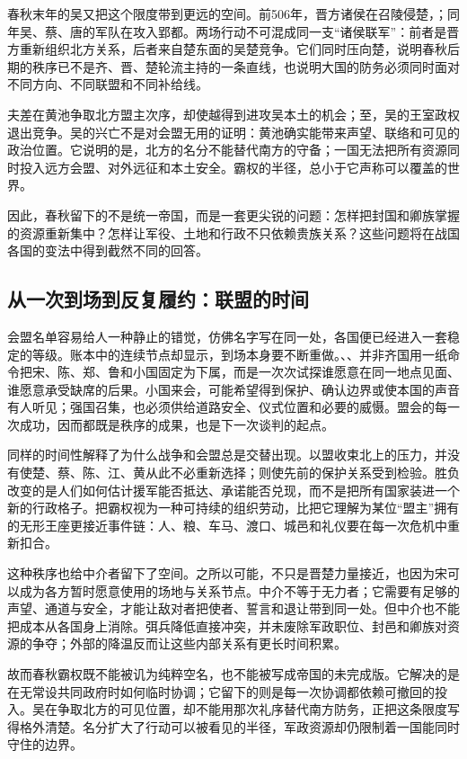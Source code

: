 春秋末年的吴又把这个限度带到更远的空间。前506年，晋方诸侯在召陵侵楚，；同年吴、蔡、唐的军队在攻入郢都。两场行动不可混成同一支“诸侯联军”：前者是晋方重新组织北方关系，后者来自楚东面的吴楚竞争。它们同时压向楚，说明春秋后期的秩序已不是齐、晋、楚轮流主持的一条直线，也说明大国的防务必须同时面对不同方向、不同联盟和不同补给线。

夫差在黄池争取北方盟主次序，却使越得到进攻吴本土的机会；至，吴的王室政权退出竞争。吴的兴亡不是对会盟无用的证明：黄池确实能带来声望、联络和可见的政治位置。它说明的是，北方的名分不能替代南方的守备；一国无法把所有资源同时投入远方会盟、对外远征和本土安全。霸权的半径，总小于它声称可以覆盖的世界。

因此，春秋留下的不是统一帝国，而是一套更尖锐的问题：怎样把封国和卿族掌握的资源重新集中？怎样让军役、土地和行政不只依赖贵族关系？这些问题将在战国各国的变法中得到截然不同的回答。

\subsection{从一次到场到反复履约：联盟的时间}

会盟名单容易给人一种静止的错觉，仿佛名字写在同一处，各国便已经进入一套稳定的等级。账本中的连续节点却显示，到场本身要不断重做。、、并非齐国用一纸命令把宋、陈、郑、鲁和小国固定为下属，而是一次次试探谁愿意在同一地点见面、谁愿意承受缺席的后果。小国来会，可能希望得到保护、确认边界或使本国的声音有人听见；强国召集，也必须供给道路安全、仪式位置和必要的威慑。盟会的每一次成功，因而都既是秩序的成果，也是下一次谈判的起点。

同样的时间性解释了为什么战争和会盟总是交替出现。以盟收束北上的压力，并没有使楚、蔡、陈、江、黄从此不必重新选择；则使先前的保护关系受到检验。胜负改变的是人们如何估计援军能否抵达、承诺能否兑现，而不是把所有国家装进一个新的行政格子。把霸权视为一种可持续的组织劳动，比把它理解为某位“盟主”拥有的无形王座更接近事件链：人、粮、车马、渡口、城邑和礼仪要在每一次危机中重新扣合。

这种秩序也给中介者留下了空间。之所以可能，不只是晋楚力量接近，也因为宋可以成为各方暂时愿意使用的场地与关系节点。中介不等于无力者；它需要有足够的声望、通道与安全，才能让敌对者把使者、誓言和退让带到同一处。但中介也不能把成本从各国身上消除。弭兵降低直接冲突，并未废除军政职位、封邑和卿族对资源的争夺；外部的降温反而让这些内部关系有更长时间积累。

故而春秋霸权既不能被讥为纯粹空名，也不能被写成帝国的未完成版。它解决的是在无常设共同政府时如何临时协调；它留下的则是每一次协调都依赖可撤回的投入。吴在争取北方的可见位置，却不能用那次礼序替代南方防务，正把这条限度写得格外清楚。名分扩大了行动可以被看见的半径，军政资源却仍限制着一国能同时守住的边界。

